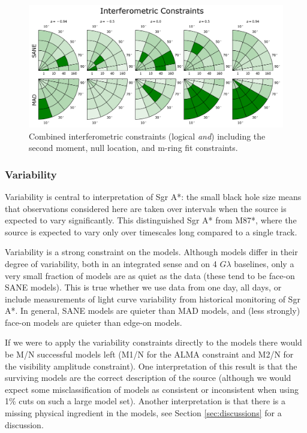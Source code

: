 
\begin{figure}
  \centering
    \includegraphics[width=\columnwidth]{./figures/Interferometric_Hard_Cut.png}
  \caption{Combined interferometric constraints (logical {\em and}) including the second moment, null location, and m-ring fit constraints.}
  \label{fig:all_EHT_constraints}
\end{figure}

\subsubsection{Variability}

Variability is central to interpretation of Sgr A*: the small black hole size means that observations considered here are taken over intervals when the source is expected to vary significantly.  This distinguished Sgr A* from M87*, where the source is expected to vary only over timescales long compared to a single track.

Variability is a strong constraint on the models.  Although models differ in their degree of variability, both in an integrated sense and on 4 $G\lambda$ baselines, only a very small fraction of models are as quiet as the data (these tend to be face-on SANE models).  This is true whether we use data from one day, all days, or include measurements of light curve variability from historical monitoring of Sgr A*.   In general, SANE models are quieter than MAD models, and (less strongly) face-on models are quieter than edge-on models.

If we were to apply the variability constraints directly to the models there would be M/N successful models left (M1/N for the ALMA constraint and M2/N for the visibility amplitude constraint).  One interpretation of this result is that the surviving models are the correct description of the source (although we would expect some misclassification of models as consistent or inconsistent when using 1\% cuts on such a large model set).  Another interpretation is that there is a missing physical ingredient in the models, see Section \ref{sec:discussions} for a discussion.

